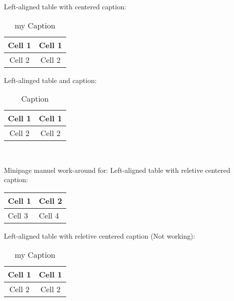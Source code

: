 			\noindent
			Left-aligned table with centered caption: \noindent
			\begin{table}[H]
				\raggedright %
				\begin{tabular}{|c|c|}
					\hline
					Cell 1 & Cell 1 \\
					\hline
					Cell 2 & Cell 2 \\
					\hline
				\end{tabular}
				\caption{my Caption}
				\label{tab:mytable}
			\end{table}
			
			\noindent
			Left-alinged table and caption:
			\begin{table}[H]
				\raggedright
				\captionsetup{justification=raggedright,singlelinecheck=false}
				\begin{tabular}{|c|c|}
					\hline
					Cell 1 & Cell 1 \\
					\hline
					Cell 2 & Cell 2 \\
					\hline
				\end{tabular}\\
				\caption{Caption}
			\end{table}
			
			\clearpage
			\noindent
			Minipage manuel work-around for: Left-aligned table with reletive centered caption: \bigbreak \noindent
			\begin{minipage}[t]{0.5\linewidth}
				\centering
				\begin{tabular}{|m{3cm}|m{3cm}|}
					\hline
					Cell 1 & Cell 2 \\
					\hline
					Cell 3 & Cell 4 \\
					\hline
				\end{tabular}
			\end{minipage}
			
			\bigbreak \noindent
			Left-aligned table with reletive centered caption (Not working): \noindent
			\begin{table}[H]
				\raggedright
				\begin{tabular}{|c|c|}
					\hline
					Cell 1 & Cell 1 \\
					\hline
					Cell 2 & Cell 2 \\
					\hline
				\end{tabular}
				\caption{my Caption}
				\label{tab:mytable}
			\end{table}
			
